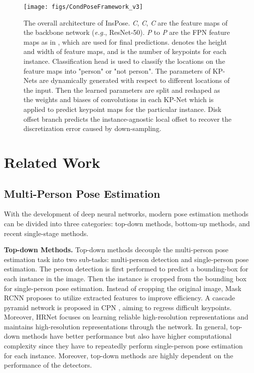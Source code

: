 \documentclass[sigconf]{acmart}
\begin{document}
\begin{figure*}[ht]
  \centering
  \texttt{[image: figs/CondPoseFramework\_v3]}
  \caption{The overall architecture of InsPose. \textit{C}, \textit{C}, \textit{C} are the feature maps of the backbone network (\textit{e.g.}, ResNet-50). \textit{P} to \textit{P} are the FPN feature maps as in \cite{lin2017feature, tian2019fcos}, which are used for final predictions.  denotes the height and width of feature maps, and  is the number of keypoints for each instance. Classification head is used to classify the locations on the feature maps into "person" or "not person".
  The parameters of KP-Nets are dynamically generated with respect to different locations of the input. Then the learned parameters are split and reshaped as the weights and biases of convolutions in each KP-Net which is applied to predict keypoint maps for the particular instance.
  Disk offset branch predicts the instance-agnostic local offset to recover the discretization error caused by down-sampling.}
  \label{fig:CondPose}
\end{figure*}

\section{Related Work}
\subsection{Multi-Person Pose Estimation}
With the development of deep neural networks, modern pose estimation methods can be divided into three categories: top-down methods, bottom-up methods, and recent single-stage methods.

\textbf{Top-down Methods.}\quad
Top-down methods decouple the multi-person pose estimation task into two sub-tasks: multi-person detection and single-person pose estimation.
The person detection is first performed to predict a bounding-box for each instance in the image.
Then the instance is cropped from the bounding box for single-person pose estimation.
Instead of cropping the original image, Mask RCNN \cite{he2017mask} proposes to utilize extracted features to improve efficiency.
A cascade pyramid network is proposed in CPN \cite{chen2018cascaded}, aiming to regress difficult keypoints.
Moreover, HRNet \cite{sun2019deep} focuses on learning reliable high-resolution representations and maintains high-resolution representations through the network.
In general, top-down methods have better performance but also have higher computational complexity since they have to repeatedly perform single-person pose estimation for each instance.
Moreover, top-down methods are highly dependent on the performance of the detectors.
\end{document}
